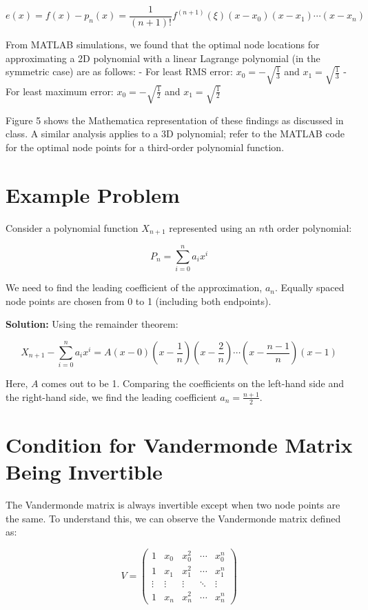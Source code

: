 \documentclass[12pt]{report} %
\begin{document}
\[
e(x) = f(x) - p_n(x) = \frac{1}{(n + 1)!} f^{(n+1)}(\xi)(x - x_0)(x - x_1) \cdots (x - x_n)
\]

From MATLAB simulations, we found that the optimal node locations for approximating a 2D polynomial with a linear Lagrange polynomial (in the symmetric case) are as follows:
- For least RMS error: \( x_0 = -\sqrt{\frac{1}{3}} \) and \( x_1 = \sqrt{\frac{1}{3}} \)
- For least maximum error: \( x_0 = -\sqrt{\frac{1}{2}} \) and \( x_1 = \sqrt{\frac{1}{2}} \)

Figure 5 shows the Mathematica representation of these findings as discussed in class. A similar analysis applies to a 3D polynomial; refer to the MATLAB code for the optimal node points for a third-order polynomial function.

\section*{Example Problem}
Consider a polynomial function \( X_{n+1} \) represented using an \( n \)th order polynomial:

\[
P_n = \sum_{i=0}^{n} a_i x^i
\]

We need to find the leading coefficient of the approximation, \( a_n \). Equally spaced node points are chosen from 0 to 1 (including both endpoints).

\textbf{Solution:} Using the remainder theorem:

\[
X_{n+1} - \sum_{i=0}^{n} a_i x^i = A (x - 0)(x - \frac{1}{n})(x - \frac{2}{n}) \cdots (x - \frac{n-1}{n})(x - 1)
\]

Here, \( A \) comes out to be 1. Comparing the coefficients on the left-hand side and the right-hand side, we find the leading coefficient \( a_n = \frac{n + 1}{2} \).

\section{Condition for Vandermonde Matrix Being Invertible}
The Vandermonde matrix is always invertible except when two node points are the same. To understand this, we can observe the Vandermonde matrix defined as:

\[
V =
\begin{pmatrix}
1 & x_0 & x_0^2 & \cdots & x_0^n \\
1 & x_1 & x_1^2 & \cdots & x_1^n \\
\vdots & \vdots & \vdots & \ddots & \vdots \\
1 & x_n & x_n^2 & \cdots & x_n^n
\end{pmatrix}
\]
\end{document}
